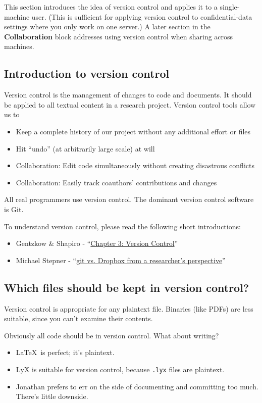 This section introduces the idea of version control and applies it to a single-machine user.
(This is sufficient for applying version control to confidential-data settings where you only work on one server.)
A later section in the \textbf{Collaboration} block addresses using version control when sharing across machines.

\subsection{Introduction to version control}

Version control is the management of changes to code and documents.
It should be applied to all textual content in a research project.
Version control tools allow us to
\begin{itemize}
	\item Keep a complete history of our project without any additional effort or files
	\item Hit ``undo'' (at arbitrarily large scale) at will
	\item Collaboration: Edit code simultaneously without creating disastrous conflicts
	\item Collaboration: Easily track coauthors' contributions and changes
\end{itemize}
All real programmers use version control. The dominant version control software is Git.

To understand version control, please read the following short introductions:
\begin{itemize}
	\item Gentzkow \& Shapiro - ``\href{https://web.stanford.edu/~gentzkow/research/CodeAndData.pdf}{Chapter 3: Version Control}''
	\item Michael Stepner - ``\href{https://michaelstepner.com/blog/git-vs-dropbox}{git vs. Dropbox from a researcher's perspective}''
\end{itemize}

\subsection{Which files should be kept in version control?}

Version control is appropriate for any plaintext file.
Binaries (like PDFs) are less suitable, since you can't examine their contents.

Obviously all code should be in version control. What about writing?
\begin{itemize}
	\item \LaTeX\ is perfect; it's plaintext.
	\item LyX is suitable for version control, because \texttt{.lyx} files are plaintext.
	\item Jonathan prefers to err on the side of documenting and committing too much. There's little downside.
\end{itemize}


